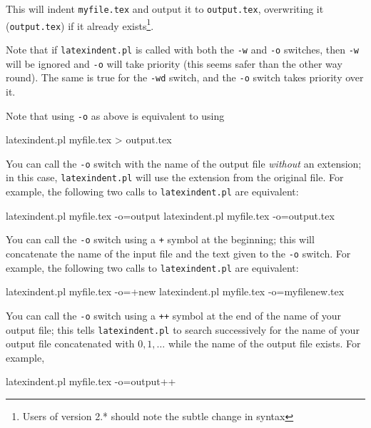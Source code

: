  This will indent \texttt{myfile.tex} and output it to \texttt{output.tex}, overwriting
 it (\texttt{output.tex}) if it already exists\footnote{Users of version 2.* should note
 the subtle change in syntax}.

 Note that if \texttt{latexindent.pl} is called with both the \texttt{-w} and \texttt{-o}
 switches, then \texttt{-w} will be ignored and \texttt{-o} will take priority (this
 seems safer than the other way round). The same is true for the \texttt{-wd} switch, and
 the \texttt{-o} switch takes priority over it.

 Note that using \texttt{-o} as above is equivalent to using

 \begin{commandshell}
latexindent.pl myfile.tex > output.tex
\end{commandshell}

 You can call the \texttt{-o} switch with the name of the output file \emph{without} an
 extension; in  this case,
 \texttt{latexindent.pl} will use the extension from the original file. For example, the
 following two calls to \texttt{latexindent.pl} are equivalent:%

 \begin{commandshell}
latexindent.pl myfile.tex -o=output
latexindent.pl myfile.tex -o=output.tex
\end{commandshell}

 You can call the \texttt{-o} switch using a \texttt{+} symbol at the beginning; this
 will  concatenate the name of the input file
 and the text given to the \texttt{-o} switch. For example, the following two calls to
 \texttt{latexindent.pl} are equivalent:%

 \begin{commandshell}
latexindent.pl myfile.tex -o=+new
latexindent.pl myfile.tex -o=myfilenew.tex
\end{commandshell}

 You can call the \texttt{-o} switch using a \texttt{++} symbol at the end of the name
  of your output file; this tells
 \texttt{latexindent.pl} to search successively for the name of your output file
 concatenated with $0, 1, \ldots$ while the name of the output file exists. For example,%

 \begin{commandshell}
latexindent.pl myfile.tex -o=output++
\end{commandshell}

